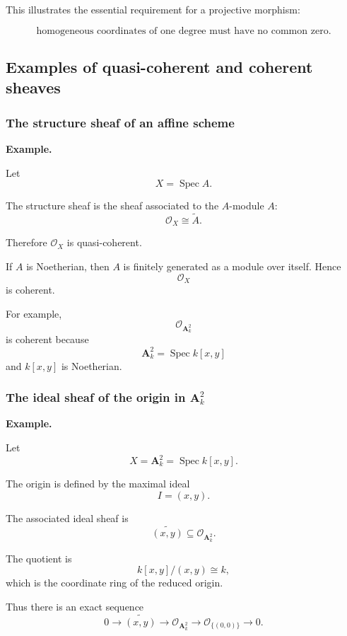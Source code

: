 \documentclass[12pt,a4paper]{article}
\theoremstyle{notespace}
\begin{document}
This illustrates the essential requirement for a projective morphism:

\[
\boxed{
	\text{homogeneous coordinates of one degree must have no common zero.}
}
\]

\subsection{Examples of quasi-coherent and coherent sheaves}

\subsubsection{The structure sheaf of an affine scheme}

\textbf{Example.}

Let
\[
X=\operatorname{Spec}A.
\]

The structure sheaf is the sheaf associated to the \(A\)-module \(A\):
\[
\mathcal O_X\cong\widetilde A.
\]

Therefore \(\mathcal O_X\) is quasi-coherent.

If \(A\) is Noetherian, then \(A\) is finitely generated as a module over itself. Hence
\[
\mathcal O_X
\]
is coherent.

For example,
\[
\mathcal O_{\mathbf A^2_k}
\]
is coherent because
\[
\mathbf A^2_k=\operatorname{Spec}k[x,y]
\]
and \(k[x,y]\) is Noetherian.

\subsubsection{The ideal sheaf of the origin in \(\mathbf A^2_k\)}

\textbf{Example.}

Let
\[
X=\mathbf A^2_k=\operatorname{Spec}k[x,y].
\]

The origin is defined by the maximal ideal
\[
I=(x,y).
\]

The associated ideal sheaf is
\[
\widetilde{(x,y)}\subseteq\mathcal O_{\mathbf A^2_k}.
\]

The quotient is
\[
k[x,y]/(x,y)\cong k,
\]
which is the coordinate ring of the reduced origin.

Thus there is an exact sequence
\[
0
\longrightarrow
\widetilde{(x,y)}
\longrightarrow
\mathcal O_{\mathbf A^2_k}
\longrightarrow
\mathcal O_{\{(0,0)\}}
\longrightarrow
0.
\]
\end{document}
